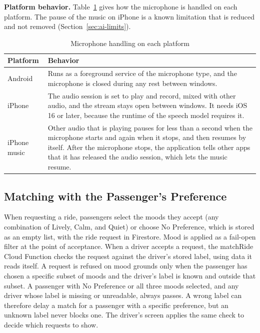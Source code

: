 \textbf{Platform behavior.} Table~\ref{tab:ai-mic} gives how the microphone is handled on each platform. The pause of the music on iPhone is a known limitation that is reduced and not removed (Section~\ref{sec:ai-limits}).

\begin{table}[htbp]
    \centering
    \caption{Microphone handling on each platform}\label{tab:ai-mic}
    \small
    \renewcommand{\arraystretch}{1.2}
    \begin{tabular}{|>{\raggedright\arraybackslash}p{}|>{\raggedright\arraybackslash}p{}|}
        \hline
        \textbf{Platform} & \textbf{Behavior} \\
        \hline
        Android & Runs as a foreground service of the microphone type, and the microphone is closed during any rest between windows. \\
        \hline
        iPhone & The audio session is set to play and record, mixed with other audio, and the stream stays open between windows. It needs iOS 16 or later, because the runtime of the speech model requires it. \\
        \hline
        iPhone music & Other audio that is playing pauses for less than a second when the microphone starts and again when it stops, and then resumes by itself. After the microphone stops, the application tells other apps that it has released the audio session, which lets the music resume. \\
        \hline
    \end{tabular}
\end{table}

\subsection{Matching with the Passenger's Preference}
\label{sec:moodmatch}
When requesting a ride, passengers select the moods they accept (any combination of Lively, Calm, and Quiet) or choose No Preference, which is stored as an empty list, with the ride request in Firestore. Mood is applied as a fail-open filter at the point of acceptance. When a driver accepts a request, the matchRide Cloud Function checks the request against the driver's stored label, using data it reads itself. A request is refused on mood grounds only when the passenger has chosen a specific subset of moods and the driver's label is known and outside that subset. A passenger with No Preference or all three moods selected, and any driver whose label is missing or unreadable, always passes. A wrong label can therefore delay a match for a passenger with a specific preference, but an unknown label never blocks one. The driver's screen applies the same check to decide which requests to show.


